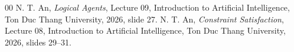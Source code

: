 \documentclass[conference]{IEEEtran}
\begin{document}
\begin{thebibliography}{00}
 N. T. An, \emph{Logical Agents},
Lecture 09, Introduction to Artificial Intelligence,
Ton Duc Thang University, 2026, slide 27.
 N. T. An, \emph{Constraint Satisfaction},
Lecture 08, Introduction to Artificial Intelligence,
Ton Duc Thang University, 2026, slides 29--31.
\end{thebibliography}
\end{document}
